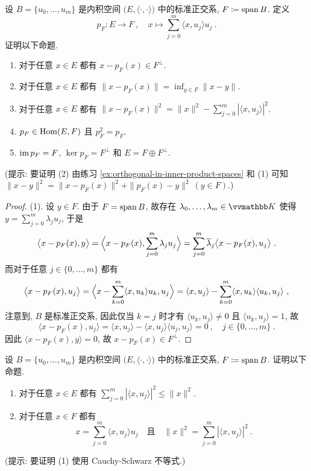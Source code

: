 \begin{exercise}
    设 \(B = \{u_0, \ldots, u_m\}\) 是内积空间 \(\bigl(E, \langle \cdot, \cdot \rangle\bigr)\) 中的标准正交系, \(F \coloneqq \operatorname{span} B\). 定义
    \[
        p_F \colon E \to F\ ,\quad x \mapsto \sum_{j = 0}^m \langle x, u_j \rangle u_j\ .
    \]
    证明以下命题.
    \begin{enumerate}
        \item 对于任意 \(x \in E\) 都有 \(x - p_F(x) \in F^\perp\).
        \item 对于任意 \(x \in E\) 都有 \(\|x - p_F(x)\| = \inf_{y \in F} \|x - y\|\).
        \item 对于任意 \(x \in E\) 都有 \(\|x - p_F(x)\|^2 = \|x\|^2 - \sum_{j = 0}^m |\langle x, u_j \rangle|^2\).
        \item \(p_F \in \operatorname{Hom}(E, F)\) 且 \(p_F^2 = p_F\).
        \item \(\operatorname{im} p_F = F\), \(\ker p_F = F^\perp\) 和 \(E = F \oplus F^\perp\).
    \end{enumerate}
    (提示: 要证明 (2) 由练习 \ref{ex:orthogonal-in-inner-product-spaces} 和 (1) 可知 \(\|x - y\|^2 = \|x - p_F(x)\|^2 + \|p_F(x) - y\|^2\ (y \in F)\).)
\end{exercise}

\begin{proof}
    (1). 设 \(y \in F\). 由于 \(F = \operatorname{span} B\), 故存在 \(\lambda_0, \ldots, \lambda_m \in \K\) 使得 
    \(y = \sum_{j = 0}^m \lambda_j u_j\), 于是
    \[
        \bigl\langle x - p_F(x), y \bigr\rangle = \Bigl\langle x - p_F(x), \sum_{j = 0}^m \lambda_j u_j \Bigr\rangle = \sum_{j = 0}^m \overline \lambda_j \bigl\langle x - p_F(x), u_j \bigr\rangle\ .
    \]
    而对于任意 \(j \in \{0, \ldots, m\}\) 都有
    \[
        \bigl\langle x - p_F(x), u_j \bigr\rangle = \Bigl\langle x - \sum_{k = 0}^m \langle x, u_k \rangle u_k, u_j \Bigr\rangle = \langle x, u_j \rangle - \sum_{k = 0}^m \langle x, u_k \rangle \langle u_k, u_j \rangle\ ,
    \]
    注意到, \(B\) 是标准正交系, 因此仅当 \(k = j\) 时才有 \(\langle u_k, u_j \rangle \neq 0\) 且 \(\langle u_k, u_j \rangle = 1\), 故
    \[
        \bigl\langle x - p_F(x), u_j \bigr\rangle = \langle x, u_j \rangle - \langle x, u_j \rangle \langle u_j, u_j \rangle = 0\ ,\quad j \in \{0, \ldots, m\}\ .
    \]
    因此 \(\bigl\langle x - p_F(x), y \bigr\rangle = 0\), 故 \(x - p_F(x) \in F^\perp\).
\end{proof}

\begin{exercise}
    设 \(B = \{u_0, \ldots, u_m\}\) 是内积空间 \(\bigl(E, \langle \cdot, \cdot \rangle\bigr)\) 中的标准正交系, \(F \coloneqq \operatorname{span} B\). 证明以下命题.
    \begin{enumerate}
        \item 对于任意 \(x \in E\) 都有 \(\sum_{j = 0}^m |\langle x, u_j \rangle|^2 \leq \|x\|^2\).
        \item 对于任意 \(x \in F\) 都有
        \[
            x = \sum_{j = 0}^m \langle x, u_j \rangle u_j\quad \text{且}\quad \|x\|^2 = \sum_{j = 0}^m |\langle x, u_j \rangle|^2\ .
        \]
    \end{enumerate}
    (提示: 要证明 (1) 使用 Cauchy-Schwarz 不等式.)
\end{exercise}

